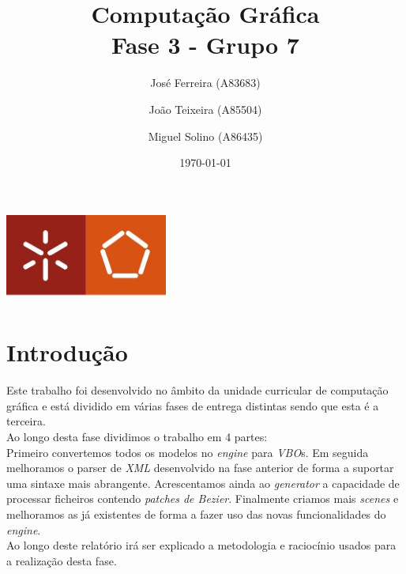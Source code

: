 \documentclass[a4paper]{report}
\begin{document}
\title{Computação Gráfica\\
\large Fase 3 - Grupo 7}
\author{José Ferreira (A83683) \and João Teixeira (A85504) \and Miguel Solino (A86435)}
\date{\today}

\begin{center}
    \begin{minipage}{0.75\linewidth}
        \centering
        \includegraphics[width=0.4\textwidth]{images/eng.jpeg}\par\vspace{1cm}
        \vspace{1.5cm}
        \href{https://www.uminho.pt/PT}
        {\color{black}{\scshape\LARGE Universidade do Minho}} \par
        \vspace{1cm}
        \href{https://www.di.uminho.pt/}
        {\color{black}{\scshape\Large Departamento de Informática}} \par
        \vspace{1.5cm}
        \maketitle
    \end{minipage}
\end{center}

\tableofcontents

\chapter{Introdução}
Este trabalho foi desenvolvido no âmbito da unidade curricular de computação
gráfica e está dividido em várias fases de entrega distintas sendo que esta é a
terceira.\\
Ao longo desta fase dividimos o trabalho em 4 partes:\\
Primeiro convertemos todos os modelos no \textit{engine} para \textit{VBO}s. Em
seguida melhoramos o parser de \textit{XML} desenvolvido na fase anterior de
forma a suportar uma sintaxe mais abrangente. Acrescentamos ainda ao
\textit{generator} a capacidade de processar ficheiros contendo \textit{patches
de Bezier}. Finalmente criamos mais \textit{scenes} e melhoramos as já
existentes de forma a fazer uso das novas funcionalidades do \textit{engine}.\\
Ao longo deste relatório irá ser explicado a metodologia e raciocínio usados
para a realização desta fase.\\
\end{document}
